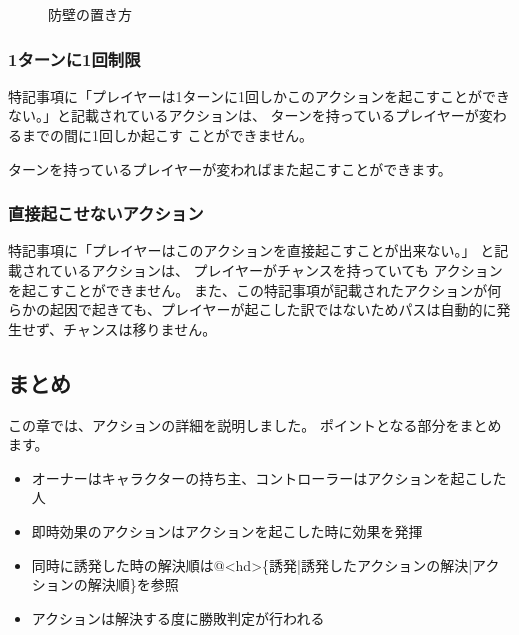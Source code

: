 \documentclass[letterpaper,10pt,dvipdfmx]{sphinxmanual}
\begin{document}
\begin{figure}[htbp]
\centering
\capstart

\noindent{}
\caption{防壁の置き方}\label{\detokenize{common/05-action_detail:id18}}\label{\detokenize{common/05-action_detail:set-bulwork}}\end{figure}


\subsubsection{1ターンに1回制限}
\label{\detokenize{common/05-action_detail:id14}}
特記事項に「プレイヤーは1ターンに1回しかこのアクションを起こすことができない。」と記載されているアクションは、
ターンを持っているプレイヤーが変わるまでの間に1回しか起こす
ことができません。

ターンを持っているプレイヤーが変わればまた起こすことができます。


\subsubsection{直接起こせないアクション}
\label{\detokenize{common/05-action_detail:id15}}
特記事項に「プレイヤーはこのアクションを直接起こすことが出来ない。」
と記載されているアクションは、
プレイヤーがチャンスを持っていても
アクションを起こすことができません。
また、この特記事項が記載されたアクションが何らかの起因で起きても、プレイヤーが起こした訳ではないためパスは自動的に発生せず、チャンスは移りません。


\subsection{まとめ}
\label{\detokenize{common/05-action_detail:id16}}
この章では、アクションの詳細を説明しました。
ポイントとなる部分をまとめます。
\begin{itemize}
\item {} 
オーナーはキャラクターの持ち主、コントローラーはアクションを起こした人

\item {} 
即時効果のアクションはアクションを起こした時に効果を発揮

\item {} 
同時に誘発した時の解決順は@\textless{}hd\textgreater{}\{誘発|誘発したアクションの解決|アクションの解決順\}を参照

\item {} 
アクションは解決する度に勝敗判定が行われる

\end{itemize}
\end{document}
